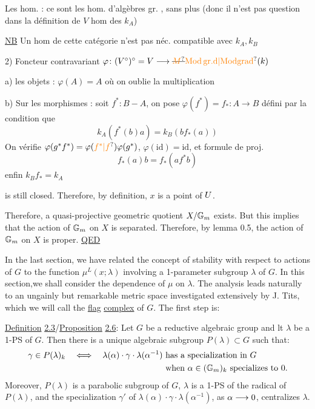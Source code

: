 Les hom.  : ce sont les hom. d'algèbres gr. , sans plus (donc il n'est pas question dans la définition de $V$ hom des $k_A$)

\uline{NB} Un hom de cette catégorie n'est pas néc. compatible avec  $k_A,k_B$

2) Foncteur contravariant $\varphi\colon (V^\circ)^\circ=V\longrightarrow\deleted{\unsure{M}}\unsure{\mathrm{Mod\,gr.d}|\mathrm{Modgrad}}(k)$

a)  les objets : $\varphi(A)=A$ où on oublie la multiplication

b) Sur les morphismes : soit $f^*\colon B\mathbin{-}A$, on pose $\varphi(f^*)=f_*\colon A\longrightarrow B$ défini par la condition que
\[
k_A(f^*(b)a)=k_B(bf_*(a))
\]
On vérifie $\varphi(g^*f^*)=\varphi(\unsure{f^*|f})\varphi(g^*)$, $\varphi(\mathrm{id})=\mathrm{id}$, et formule de proj.
\[
f_*(a)b=f_*(af^*b)
\]
enfin  $k_B f_*=k_A$

is still closed. Therefore, by definition, $x$ is a point of $U$.

Therefore, a quasi-projective geometric quotient $X/\mathbb{G}_m$ exists. But this implies that the action of $\mathbb{G}_m$ on $X$ is separated. Therefore, by lemma 0.5, the action of $\mathbb{G}_m$ on $X$ is proper. \uline{QED}

 In the last section, we have related the concept of stability with respect to actions of $G$ to the function $\mu^L(x;\lambda)$ involving a 1-parameter subgroup $\lambda$ of $G$. In this section,we shall consider the dependence of $\mu$ on $\lambda$. The analysis leads naturally to an ungainly but remarkable metric space investigated extensively by J. Tits, which we will call the \uline{flag} \uline{complex} of $G$. The first step is:

\uline{Definition} \uline{2.3}/\uline{Proposition} \uline{2.6}: Let $G$ be a reductive algebraic group and lt $\lambda$ be a 1-PS of $G$. Then there is a unique algebraic subgroup $P(\lambda)\subset G$ such that:
\[
\begin{aligned}
\gamma\in P(\lambda)_k\quad\Longleftrightarrow\quad\lambda(\alpha)\cdot\gamma\cdot\lambda(\alpha^{-1})&\text{ has a specialization in }G\\
&\text{ when }\alpha\in(\mathbb{G}_m)_k\text{ specializes to }0.
\end{aligned}
\]
Moreover, $P(\lambda)$ is a parabolic subgroup of $G$, $\lambda$ is a 1-PS of the radical of $P(\lambda)$, and the specialization $\gamma'$ of $\lambda(\alpha)\cdot\gamma\cdot\lambda(\alpha^{-1})$, as $\alpha\longrightarrow0$, centralizes $\lambda$.


